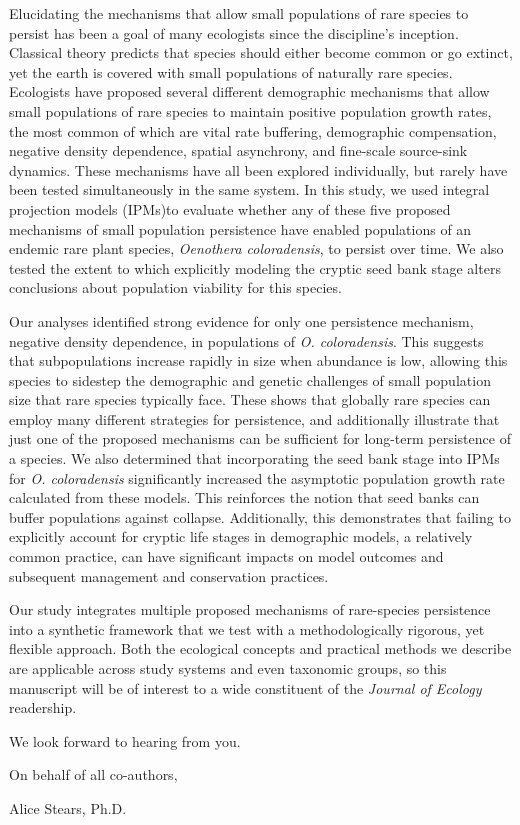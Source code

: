 \documentclass{article}
\begin{document}
Elucidating the mechanisms that allow small populations of rare species to persist has been a goal of many ecologists since the discipline's inception. Classical theory predicts that species should either become common or go extinct, yet the earth is covered with small populations of naturally rare species. Ecologists have proposed several different demographic mechanisms that allow small populations of rare species to maintain positive population growth rates, the most common of which are vital rate buffering, demographic compensation, negative density dependence, spatial asynchrony, and fine-scale source-sink dynamics. These mechanisms have all been explored individually, but rarely have been tested simultaneously in the same system. In this study, we used integral projection models (IPMs)to evaluate whether any of these five proposed mechanisms of small population persistence have enabled populations of an endemic rare plant species, \textit{Oenothera coloradensis}, to persist over time. We also tested the extent to which explicitly modeling the cryptic seed bank stage alters conclusions about population viability for this species.

Our analyses identified strong evidence for only one persistence mechanism, negative density dependence, in populations of \textit{O. coloradensis}. This suggests that subpopulations increase rapidly in size when abundance is low, allowing this species to sidestep the demographic and genetic challenges of small population size that rare species typically face. These shows that globally rare species can employ many different strategies for persistence, and additionally illustrate that just one of the proposed mechanisms can be sufficient for long-term persistence of a species. We also determined that incorporating the seed bank stage into IPMs for \textit{O. coloradensis} significantly increased the asymptotic population growth rate calculated from these models. This reinforces the notion that seed banks can buffer populations against collapse. Additionally, this demonstrates that failing to explicitly account for cryptic life stages in demographic models, a relatively common practice, can have significant impacts on model outcomes and subsequent management and conservation practices. 

Our study integrates multiple proposed mechanisms of rare-species persistence into a synthetic framework that we test with a methodologically rigorous, yet flexible approach. Both the ecological concepts and practical methods we describe are applicable across study systems and even taxonomic groups, so this manuscript will be of interest to a wide constituent of the \textit{Journal of Ecology} readership. 

We look forward to hearing from you.


\bigskip %

On behalf of all co-authors,

\bigskip %

Alice Stears, Ph.D.
\end{document}
